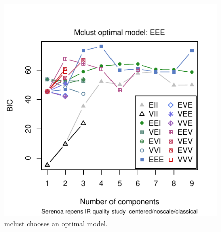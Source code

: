 \documentclass[letter,10pt,twocolumn,twoside,printwatermark=false]{pinp}
\begin{document}
\begin{Shaded}
\begin{Highlighting}[]
\StringTok{ }
   \NormalTok{,}
\end{Highlighting}
\end{Shaded}

\begin{figure}

{\centering \includegraphics{ChemoSpec2_files/figure-latex/Chunk35-1} 

}

\caption{\label{mclust1}mclust chooses an optimal model.}\label{fig:Chunk35}
\end{figure}

\begin{Shaded}
\begin{Highlighting}[]
\StringTok{ }
   \NormalTok{,}
\end{Highlighting}
\end{Shaded}
\end{document}
